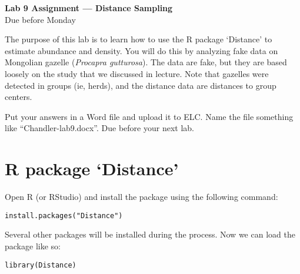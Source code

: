 \documentclass[12pt]{article}\usepackage[]{graphicx}\usepackage[]{color}
\makeatletter
\newcommand{\hlstr}[1]{\textcolor[rgb]{0.749,0.012,0.012}{#1}}%
\newcommand{\hlstd}[1]{\textcolor[rgb]{0,0,0}{#1}}%
\newcommand{\hlkwd}[1]{\textcolor[rgb]{0.004,0.004,0.506}{#1}}%
\newenvironment{kframe}{%
 \def\at@end@of@kframe{}%
 \ifinner\ifhmode%
  \def\at@end@of@kframe{\end{minipage}}%
  \begin{minipage}{\columnwidth}%
 \fi\fi%
 \def\FrameCommand##1{\hskip\@totalleftmargin \hskip-\fboxsep
 \colorbox{shadecolor}{##1}\hskip-\fboxsep
     \hskip-\linewidth \hskip-\@totalleftmargin \hskip\columnwidth}%
 \MakeFramed {\advance\hsize-\width
   \@totalleftmargin\z@ \linewidth\hsize
   \@setminipage}}%
 {\par\unskip\endMakeFramed%
 \at@end@of@kframe}
\newenvironment{knitrout}{}{} %
\makeatother
\begin{document}
{
  \Large
  \centering
  {\bf Lab 9 Assignment --- Distance Sampling} \\
  Due before Monday \par
}

\vspace{10pt}


The purpose of this lab is to learn how to use the
R package `Distance' to estimate abundance and density. You will
do this by analyzing fake data on Mongolian gazelle ({\it Procapra
  gutturosa}). The data are fake, but they are based loosely on the
study that we discussed in lecture. Note that gazelles were detected
in groups (ie, herds), and the distance data are distances to group
centers. 

Put your answers in a Word file and upload it to ELC. Name the file
something like ``Chandler-lab9.docx''. Due before your next lab.  





\section*{R package `Distance'}

Open R (or RStudio) and install the package using the following
command: 

\begin{knitrout}
\color{fgcolor}\begin{kframe}
\begin{alltt}
\hlkwd{install.packages}\hlstd{(}\hlstr{"Distance"}\hlstd{)}
\end{alltt}
\end{kframe}
\end{knitrout}

Several other packages will be installed during the process. Now we
can load the package like so: 

\begin{knitrout}
\color{fgcolor}\begin{kframe}
\begin{alltt}
\hlkwd{library}\hlstd{(Distance)}
\end{alltt}
\end{kframe}
\end{knitrout}
\end{document}
